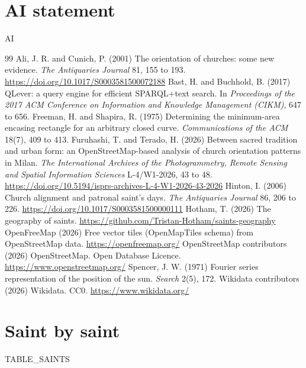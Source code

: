 \documentclass[11pt,a4paper]{article}
\begin{document}
\section*{AI statement}
{{AI}}

\begin{thebibliography}{99}
 Ali, J. R. and Cunich, P. (2001) The orientation of churches: some new evidence. \textit{The Antiquaries Journal} 81, 155 to 193. \url{https://doi.org/10.1017/S0003581500072188}
 Bast, H. and Buchhold, B. (2017) QLever: a query engine for efficient SPARQL+text search. In \textit{Proceedings of the 2017 ACM Conference on Information and Knowledge Management (CIKM)}, 647 to 656.
 Freeman, H. and Shapira, R. (1975) Determining the minimum-area encasing rectangle for an arbitrary closed curve. \textit{Communications of the ACM} 18(7), 409 to 413.
 Furuhashi, T. and Terado, H. (2026) Between sacred tradition and urban form: an OpenStreetMap-based analysis of church orientation patterns in Milan. \textit{The International Archives of the Photogrammetry, Remote Sensing and Spatial Information Sciences} L-4/W1-2026, 43 to 48. \url{https://doi.org/10.5194/isprs-archives-L-4-W1-2026-43-2026}
 Hinton, I. (2006) Church alignment and patronal saint's days. \textit{The Antiquaries Journal} 86, 206 to 226. \url{https://doi.org/10.1017/S0003581500000111}
 Hotham, T. (2026) The geography of saints. \url{https://github.com/Tristan-Hotham/saints-geography}
 OpenFreeMap (2026) Free vector tiles (OpenMapTiles schema) from OpenStreetMap data. \url{https://openfreemap.org/}
 OpenStreetMap contributors (2026) OpenStreetMap. Open Database Licence. \url{https://www.openstreetmap.org/}
 Spencer, J. W. (1971) Fourier series representation of the position of the sun. \textit{Search} 2(5), 172.
 Wikidata contributors (2026) Wikidata. CC0. \url{https://www.wikidata.org/}
\end{thebibliography}

\appendix
\section{Saint by saint}
{{TABLE_SAINTS}}
\end{document}
